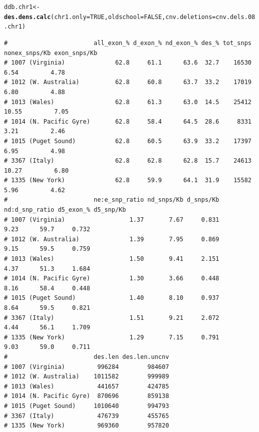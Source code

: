 \documentclass{article}\usepackage[]{graphicx}\usepackage[]{color}
\makeatletter
\newcommand{\hlnum}[1]{\textcolor[rgb]{0.686,0.059,0.569}{#1}}%
\newcommand{\hlstd}[1]{\textcolor[rgb]{0.345,0.345,0.345}{#1}}%
\newcommand{\hlkwb}[1]{\textcolor[rgb]{0.69,0.353,0.396}{#1}}%
\newcommand{\hlkwc}[1]{\textcolor[rgb]{0.333,0.667,0.333}{#1}}%
\newcommand{\hlkwd}[1]{\textcolor[rgb]{0.737,0.353,0.396}{\textbf{#1}}}%
\newenvironment{kframe}{%
 \def\at@end@of@kframe{}%
 \ifinner\ifhmode%
  \def\at@end@of@kframe{\end{minipage}}%
  \begin{minipage}{\columnwidth}%
 \fi\fi%
 \def\FrameCommand##1{\hskip\@totalleftmargin \hskip-\fboxsep
 \colorbox{shadecolor}{##1}\hskip-\fboxsep
     \hskip-\linewidth \hskip-\@totalleftmargin \hskip\columnwidth}%
 \MakeFramed {\advance\hsize-\width
   \@totalleftmargin\z@ \linewidth\hsize
   \@setminipage}}%
 {\par\unskip\endMakeFramed%
 \at@end@of@kframe}
\newenvironment{knitrout}{}{} %
\makeatother
\begin{document}
\begin{knitrout}\footnotesize
{}\color{fgcolor}\begin{kframe}
\begin{alltt}
\hlstd{ddb.chr1} \hlkwb{<-} \hlkwd{des.dens.calc}\hlstd{(}\hlkwc{chr1.only} \hlstd{=} \hlnum{TRUE}\hlstd{,} \hlkwc{oldschool} \hlstd{=} \hlnum{FALSE}\hlstd{,} \hlkwc{cnv.deletions}\hlstd{=cnv.dels.08.chr1)}
\end{alltt}
\begin{verbatim}
#                        all_exon_% d_exon_% nd_exon_% des_% tot_snps nonex_snps/Kb exon_snps/Kb
# 1007 (Virginia)              62.8     61.1      63.6  32.7    16530          6.54         4.78
# 1012 (W. Australia)          62.8     60.8      63.7  33.2    17019          6.80         4.88
# 1013 (Wales)                 62.8     61.3      63.0  14.5    25412         10.55         7.05
# 1014 (N. Pacific Gyre)       62.8     58.4      64.5  28.6     8331          3.21         2.46
# 1015 (Puget Sound)           62.8     60.5      63.9  33.2    17397          6.95         4.98
# 3367 (Italy)                 62.8     62.8      62.8  15.7    24613         10.27         6.80
# 1335 (New York)              62.8     59.9      64.1  31.9    15582          5.96         4.62
#                        ne:e_snp_ratio nd_snps/Kb d_snps/Kb nd:d_snp_ratio d5_exon_% d5_snp/Kb
# 1007 (Virginia)                  1.37       7.67     0.831           9.23      59.7     0.732
# 1012 (W. Australia)              1.39       7.95     0.869           9.15      59.5     0.759
# 1013 (Wales)                     1.50       9.41     2.151           4.37      51.3     1.684
# 1014 (N. Pacific Gyre)           1.30       3.66     0.448           8.16      58.4     0.448
# 1015 (Puget Sound)               1.40       8.10     0.937           8.64      59.5     0.821
# 3367 (Italy)                     1.51       9.21     2.072           4.44      56.1     1.709
# 1335 (New York)                  1.29       7.15     0.791           9.03      59.0     0.711
#                        des.len des.len.uncnv
# 1007 (Virginia)         996284        984607
# 1012 (W. Australia)    1011582        999989
# 1013 (Wales)            441657        424785
# 1014 (N. Pacific Gyre)  870696        859138
# 1015 (Puget Sound)     1010640        994793
# 3367 (Italy)            476739        455765
# 1335 (New York)         969360        957820
\end{verbatim}
\end{kframe}
\end{knitrout}
\end{document}
